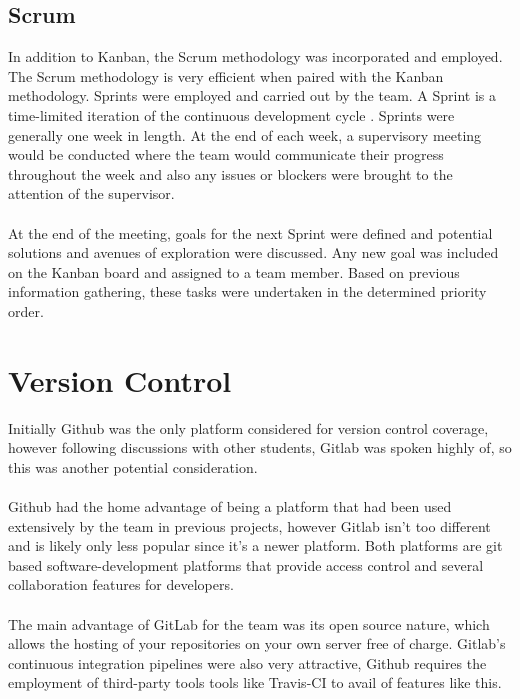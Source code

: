 \subsection{Scrum}
In addition to Kanban, the Scrum methodology was incorporated and employed. The Scrum methodology is very efficient when paired with the Kanban methodology. Sprints were employed and carried out by the team. A Sprint is a time-limited iteration of the continuous development cycle \cite{SCRUM}. Sprints were generally one week in length. At the end of each week, a supervisory meeting would be conducted where the team would communicate their progress throughout the week and also any issues or blockers were brought to the attention of the supervisor.

\paragraph{}
At the end of the meeting, goals for the next Sprint were defined and potential solutions and avenues of exploration were discussed. Any new goal was included on the Kanban board and assigned to a team member. Based on previous information gathering, these tasks were undertaken in the determined priority order.

\section{Version Control}
Initially Github \cite{GITHUB} was the only platform considered for version control coverage, however following discussions with other students, Gitlab \cite{GITLAB} was spoken highly of, so this was another potential consideration. 

\paragraph{}
Github had the home advantage of being a platform that had been used extensively by the team in previous projects, however Gitlab isn't too different and is likely only less popular since it's a newer platform. Both platforms are git based software-development platforms that provide access control and several collaboration features for developers. 

\paragraph{}
The main advantage of GitLab for the team was its open source nature, which allows the hosting of your repositories on your own server free of charge. Gitlab's continuous integration pipelines were also very attractive, Github requires the employment of third-party tools tools like Travis-CI to avail of features like this.

